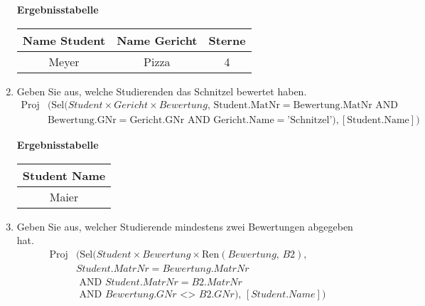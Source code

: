 \begin{enumerate}
        \begin{table}[H]
            \centering
            \textbf{Ergebnisstabelle} \\ [3pt]
            \begin{tabular}{|c|c|c|}
                \hline
                \textbf{Name Student} & \textbf{Name Gericht} & \textbf{Sterne}\\
                \hline
                Meyer & Pizza & 4 \\
                \hline  
            \end{tabular}
        \end{table}

    \item Geben Sie aus, welche Studierenden das Schnitzel bewertet haben.
        \begin{align*}
            \text{Proj}&\bigl(
            \text{Sel}(Student \times Gericht \times Bewertung,\,
            \text{Student.MatNr} = \text{Bewertung.MatNr} \text{ AND }\\
            &\text{Bewertung.GNr} = \text{Gericht.GNr} \text{ AND }
            \text{Gericht.Name} = \text{'Schnitzel'}),
            [\text{Student.Name}]
            \bigr)
            \end{align*}

        \begin{table}[H]
            \centering
            \textbf{Ergebnisstabelle} \\ [3pt]
            \begin{tabular}{|c|}
                \hline
                \textbf{Student Name}\\
                \hline
                Maier \\
                \hline  
            \end{tabular}
        \end{table}
        
    \item Geben Sie aus, welcher Studierende mindestens zwei Bewertungen abgegeben hat.
        \begin{align*}
            \text{Proj}&\bigl(
            \text{Sel}(Student \times Bewertung \times \text{Ren}(Bewertung,\, B2), \\ 
            &Student.MatrNr=Bewertung.MatrNr\\
            &\text{ AND } Student.MatrNr = B2.MatrNr\\
            & \text{ AND } Bewertung.GNr \text{ <> } B2.GNr),\, [Student.Name]
            \bigr)
        \end{align*}


\end{enumerate}
